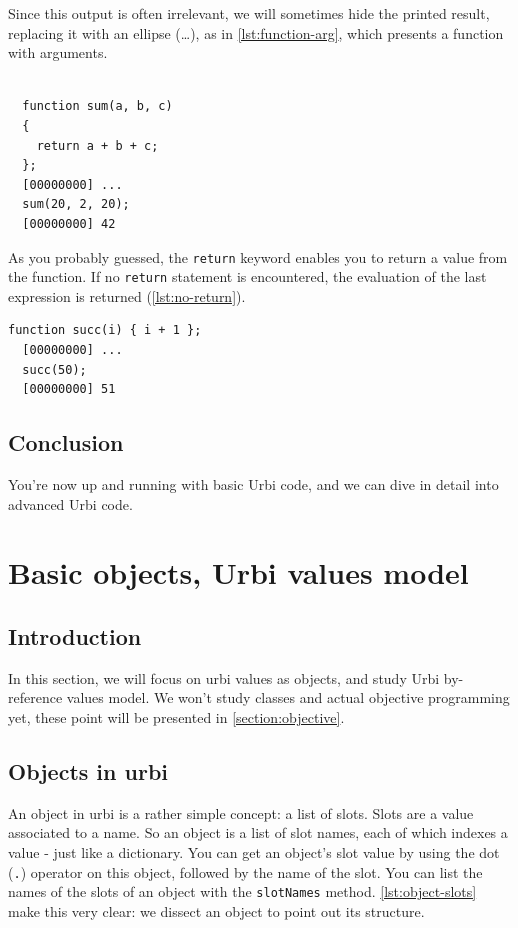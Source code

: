 \documentclass[openright,twoside,12pt]{report}
\newcommand{\urbi}{Urbi\xspace}
\newcommand{\lst}[1]{\autoref{lst:#1}}
\begin{document}
Since this output is often irrelevant, we will sometimes hide the
printed result, replacing it with an ellipse (\ldots), as in
\lst{function-arg}, which presents a function with arguments.

\begin{lstlisting}[caption=Function with
  arguments,label=lst:function-arg]

  function sum(a, b, c)
  {
    return a + b + c;
  };
  [00000000] ...
  sum(20, 2, 20);
  [00000000] 42
\end{lstlisting}

As you probably guessed, the \texttt{return} keyword enables you to
return a value from the function. If no \texttt{return} statement is
encountered, the evaluation of the last expression is returned
(\lst{no-return}).

  \begin{lstlisting}[caption=Return value is the last evaluated value,
    label=lst:no-return]
  function succ(i) { i + 1 };
  [00000000] ...
  succ(50);
  [00000000] 51
\end{lstlisting}

\section{Conclusion}

You're now up and running with basic \urbi code, and we can dive in
detail into advanced \urbi code.

\chapter{Basic objects, \urbi values model} %

\section{Introduction}

In this section, we will focus on urbi values as objects, and study
\urbi by-reference values model. We won't study classes and actual
objective programming yet, these point will be presented in
\autoref{section:objective}.

\section{Objects in urbi}

An object in urbi is a rather simple concept: a list of slots. Slots
are a value associated to a name. So an object is a list of slot
names, each of which indexes a value - just like a dictionary. You can
get an object's slot value by using the dot (\texttt{.}) operator on
this object, followed by the name of the slot. You can list the names
of the slots of an object with the \texttt{slotNames}
method. \lst{object-slots} make this very clear: we dissect an object
to point out its structure.
\end{document}
